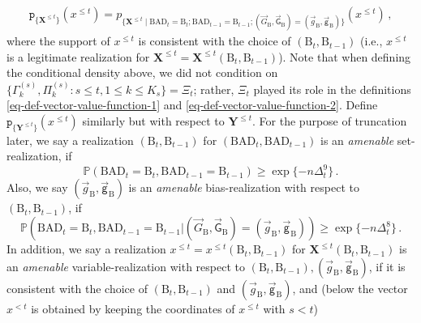 \documentclass[11pt]{article}
\numberwithin{equation}{section}
\begin{document}
\begin{align*}
    \mathtt{p}_{ \{ \mathbf{X}^{\leq t} \} } (x^{\leq t}) = p_{ \{ \mathbf{X}^{\leq t}  \mid \mathrm{BAD}_t = \mathrm{B}_t; \mathrm{BAD}_{t-1} = \mathrm{B}_{t-1}; (\overrightarrow{G}_{\mathrm{B}}, \overrightarrow{\mathsf{G}}_{\mathrm{B}}) = (\overrightarrow{g}_{\mathrm{B}}, \overrightarrow{\mathsf{g}}_{\mathrm{B}}) \} } (x^{\leq t}) \,,
\end{align*}
where the support of $x^{\leq t}$ is consistent with the choice of $(\mathrm{B}_{t}, \mathrm{B}_{t-1})$ (i.e., $x^{\leq t}$ is a legitimate realization for $\mathbf{X}^{\leq t} = \mathbf{X}^{\leq t}(\mathrm{B}_{t}, \mathrm{B}_{t-1})$). Note that when defining the conditional density above, we did not condition on $\{ \Gamma^{(s)}_k, \Pi^{(s)}_k : s \leq t, 1\leq k\leq K_s \} = \Xi_t$; rather, $\Xi_t$ played its role in the definitions \eqref{eq-def-vector-value-function-1} and \eqref{eq-def-vector-value-function-2}.
Define $\mathtt{p}_{ \{ \mathbf{Y}^{\leq t} \} } (  {x}^{\leq t} )$ similarly but with respect to $\mathbf{Y}^{\leq t}$. For the purpose of truncation later, we say a realization $( \mathrm{B}_t, \mathrm{B}_{t-1} )$ for $( \mathrm{BAD}_t, \mathrm{BAD}_{t-1} )$ is an \emph{amenable} set-realization, if 
\begin{equation}
    \mathbb{P}( \mathrm{BAD}_t = \mathrm{B}_t, \mathrm{BAD}_{t-1} = \mathrm{B}_{t-1} ) \geq \exp \{ - n \Delta_t^{9} \}  \,. \label{equ-def-good-realization-LARGE}
\end{equation}
Also, we say $(\overrightarrow{g}_{\mathrm{B}}, \overrightarrow{\mathsf{g}}_{\mathrm{B}})$ is an \emph{amenable} bias-realization with respect to $(\mathrm{B}_t, \mathrm{B}_{t-1})$, if
\begin{equation}
    \mathbb{P}( \mathrm{BAD}_t = \mathrm{B}_t, \mathrm{BAD}_{t-1} = \mathrm{B}_{t-1} | (\overrightarrow{G}_{\mathrm{B}}, \overrightarrow{\mathsf{G}}_{\mathrm{B}}) = (\overrightarrow{g}_{\mathrm{B}}, \overrightarrow{\mathsf{g}}_{\mathrm{B}}) ) \geq \exp \{ - n \Delta_t^{8} \} \,.
    \label{equ-def-good-bias-realization}
\end{equation}
In addition, we say a realization $x^{\leq t} = x^{\leq t}( \mathrm{B}_t, \mathrm{B}_{t-1} )$ for $\mathbf{X}^{\leq t} (\mathrm{B}_t, \mathrm{B}_{t-1})$ is an \emph{amenable} variable-realization with respect to $(\mathrm{B}_t, \mathrm{B}_{t-1}), (\overrightarrow{g}_{\mathrm{B}}, \overrightarrow{\mathsf{g}}_{\mathrm{B}})$, if it is consistent with the choice of $(\mathrm{B}_t,\mathrm{B}_{t-1})$ and $ (\overrightarrow{g}_{\mathrm{B}}, \overrightarrow{\mathsf{g}}_{\mathrm{B}})$, and (below the vector $x^{<t}$ is obtained by keeping the coordinates of $x^{\leq t}$ with $s<t$)
\end{document}
